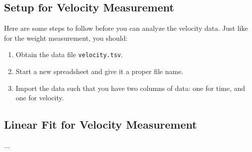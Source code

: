 \subsection{Setup for Velocity Measurement}
Here are some steps to follow before you can analyze the velocity data. Just like for the weight measurement, you should:
\begin{enumerate}
    \item Obtain the data file \texttt{velocity.tsv}.
    \item Start a new spreadsheet and give it a proper file name.
    \item Import the data such that you have two columns of data: one for time, and one for velocity.
\end{enumerate}
\subsection{Linear Fit for Velocity Measurement}
...
